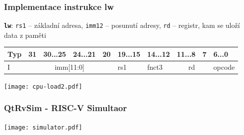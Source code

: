\documentclass{beamer}
\begin{document}
\begin{frame}[shrink=15]
\frametitle{Implementace instrukce lw}

\textbf{\texttt{lw}}: \texttt{rs1} -- základní adresa, \texttt{imm12} -- posunutí adresy, \texttt{rd} -- registr, kam se uloží data z paměti

\bigskip

\begin{table}
\footnotesize
\begin{tabular}{|m{0.4cm}|m{0.4cm}|m{1.0cm}|m{1.0cm}|m{0.4cm}|m{1.0cm}|m{1.0cm}|m{1.0cm}|m{0.4cm}|m{1.0cm}|}\hline
Typ & 31 & 30...25 & 24...21 & 20 & 19...15 & 14...12 & 11...8 & 7 & 6...0 \\ \hline
I & \multicolumn{4}{c|}{ imm[11:0] } & rs1 & fnct3 &\multicolumn{2}{c|}{ rd } & opcode\\ \hline
\end{tabular}
\end{table}

\bigskip

\begin{center}
\texttt{[image: cpu-load2.pdf]}
\end{center}
\end{frame}


\begin{frame}
\frametitle{QtRvSim - RISC-V Simultaor}

\texttt{[image: simulator.pdf]}

\end{frame}
\end{document}
